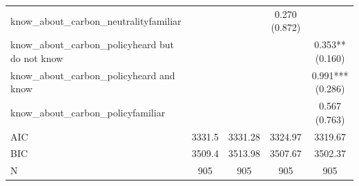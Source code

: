 \begin{table}[!htbp]
\begin{tabular}{lcccc}
know\_about\_carbon\_neutralityfamiliar &  &  & 0.270 (0.872) &  \\
know\_about\_carbon\_policyheard but do not know &  &  &  & 0.353** (0.160) \\
know\_about\_carbon\_policyheard and know &  &  &  & 0.991*** (0.286) \\
know\_about\_carbon\_policyfamiliar &  &  &  & 0.567 (0.763) \\
AIC & 3331.5 & 3331.28 & 3324.97 & 3319.67 \\
BIC & 3509.4 & 3513.98 & 3507.67 & 3502.37 \\
N & 905 & 905 & 905 & 905 \\
\hline
\end{tabular}
\end{table}
